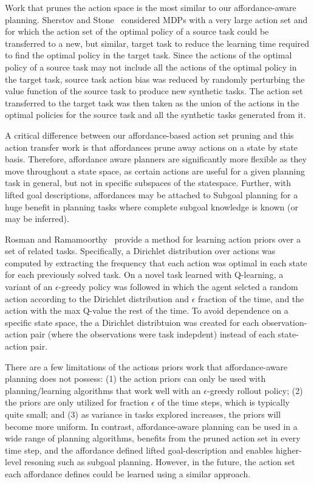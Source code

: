\documentclass[]{article}
\begin{document}
Work that prunes the action space is the most similar to our affordance-aware planning.
Sherstov and Stone~\cite{sherstov2005improving} considered MDPs with a very large action set and for which the action
set of the optimal policy of a source task could be transferred to a new, but similar, target
task to reduce the learning time required to find the optimal policy in the target task. Since the actions
of the optimal policy of a source task may not include all the actions of the optimal policy
in the target task, source task action bias was reduced by randomly perturbing the value function
of the source task to produce new synthetic tasks. The action set transferred to the target task
was then taken as the union of the actions in the optimal policies for the source task and all the
synthetic tasks generated from it.

A critical difference between our affordance-based action set pruning and this action transfer
work is that affordances prune away actions on a state by state basis. Therefore, affordance aware
planners are significantly more flexible as they move throughout a state space, as certain actions
are useful for a given planning task in general, but not in specific subspaces of the statespace. Further,
with lifted goal descriptions, affordances may be attached to Subgoal planning for a huge
benefit in planning tasks where complete subgoal knowledge is known (or may be inferred).

Rosman and Ramamoorthy~\cite{rosman2012good} provide a method for learning action priors over a set of related tasks. Specifically, a Dirichlet distribution over actions was computed by extracting the frequency that each action was optimal in each state for each previously solved task. On a novel task learned with Q-learning, a variant of an $\epsilon$-greedy policy was followed in which the agent selcted a random action according to the Dirichlet distribution and $\epsilon$ fraction of the time, and the action with the max Q-value the rest of the time. To avoid dependence on a specific state space, the a Dirichlet distribtuion was created for each observation-action pair (where the observations were task indepdent) instead of each state-action pair.

There are a few limitations of the actions priors work that affordance-aware planning does not possess: (1) the action priors can only be used with planning/learning algorithms that work well with an $\epsilon$-greedy rollout policy; (2) the priors are only utilized for fraction $\epsilon$ of the time steps, which is typically quite small; and (3) as variance in tasks explored increases, the priors will become more uniform. In contrast, affordance-aware planning can be used in a wide range of planning algorithms, benefits from the pruned action set in every time step, and the affordance defined lifted goal-description and enables higher-level resoning such as subgoal planning. However, in the future, the action set each affordance defines could be learned using a similar approach.
\end{document}

